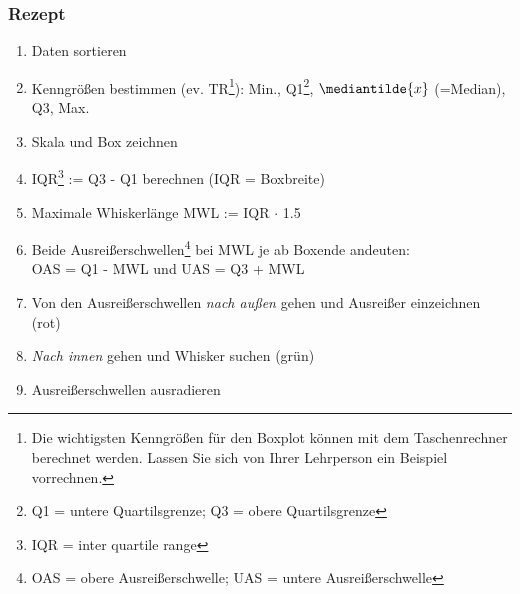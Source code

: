 

\subsubsection{Rezept}



\begin{rezept}{}{}
  \begin{enumerate}
    \item Daten sortieren
  \item Kenngrößen bestimmen (ev. TR\footnote{Die wichtigsten Kenngrößen für den Boxplot können mit dem Taschenrechner berechnet werden. Lassen Sie sich von Ihrer Lehrperson ein Beispiel vorrechnen.}): Min., Q1\footnote{Q1 = untere
    Quartilsgrenze; Q3 = obere Quartilsgrenze}, $\mediantilde{x}$ (=Median),  Q3, Max.
  \item Skala und Box zeichnen
  \item IQR\footnote{IQR = inter quartile range} := Q3 - Q1
    berechnen (IQR = Boxbreite)
    \item Maximale Whiskerlänge MWL := IQR $\cdot{}$ 1.5
  \item Beide Ausreißerschwellen\footnote{OAS = obere Ausreißerschwelle; UAS = untere Ausreißerschwelle} bei MWL je ab Boxende andeuten:\\
    OAS =
    Q1 - MWL und UAS = Q3 + MWL
  \item Von den Ausreißerschwellen \textit{nach außen} gehen und
    Ausreißer einzeichnen (rot)
  \item \textit{Nach innen} gehen und Whisker suchen (grün)
  \item Ausreißerschwellen ausradieren
  \end{enumerate}
\end{rezept}
\newpage


